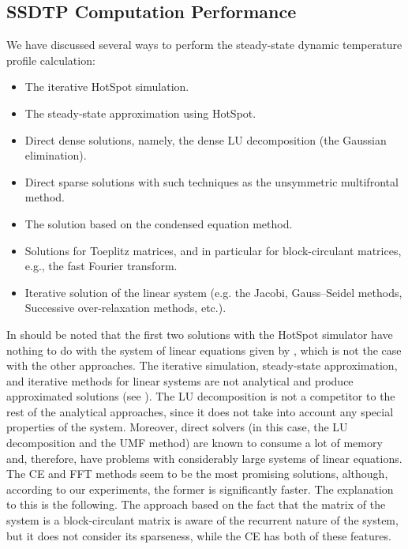 \subsection{SSDTP Computation Performance} \label{sec:results-ssdtp}
We have discussed several ways to perform the steady-state dynamic temperature profile calculation:
\begin{itemize}
  \item The iterative HotSpot simulation.
  \item The steady-state approximation using HotSpot.
  \item Direct dense solutions, namely, the dense LU decomposition (the Gaussian elimination).
  \item Direct sparse solutions with such techniques as the unsymmetric multifrontal method.
  \item The solution based on the condensed equation method.
  \item Solutions for Toeplitz matrices, and in particular for block-circulant matrices, e.g., the fast Fourier transform.
  \item Iterative solution of the linear system (e.g. the Jacobi, Gauss–Seidel methods, Successive over-relaxation methods, etc.).
\end{itemize}

In should be noted that the first two solutions with the HotSpot simulator have nothing to do with the system of linear equations given by , which is not the case with the other approaches. The iterative simulation, steady-state approximation, and iterative methods for linear systems are not analytical and produce approximated solutions (see ). The LU decomposition is not a competitor to the rest of the analytical approaches, since it does not take into account any special properties of the system. Moreover, direct solvers (in this case, the LU decomposition and the UMF method) are known to consume a lot of memory and, therefore, have problems with considerably large systems of linear equations. The CE and FFT methods seem to be the most promising solutions, although, according to our experiments, the former is significantly faster. The explanation to this is the following. The approach based on the fact that the matrix of the system is a block-circulant matrix is aware of the recurrent nature of the system, but it does not consider its sparseness, while the CE has both of these features.

